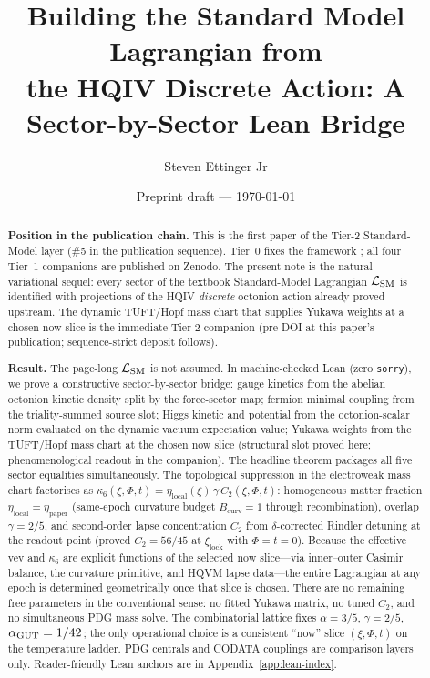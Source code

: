 \documentclass[11pt]{amsart}
\title[SM Lagrangian from HQIV Discrete Action]{Building the Standard Model Lagrangian from\\
the HQIV Discrete Action: A Sector-by-Sector Lean Bridge}
\author{Steven Ettinger Jr}
\date{Preprint draft --- \today}
\begin{document}
\begin{abstract}
\noindent\textbf{Position in the publication chain.}
This is the first paper of the Tier-2 Standard-Model layer (\#5 in the
publication sequence). Tier~0 fixes the framework
\cite{ettinger2026hqiv,hqiv-lightcone-paper,hqiv-so8-paper}; all four
Tier~1 companions
\cite{hqiv-3d-growth-paper,hqiv-oct-action-paper,hqiv-kirchhoff-paper,hqiv-thermo-arrow-paper}
are published on Zenodo. The present note is the natural variational sequel:
every sector of the textbook Standard-Model Lagrangian
$\mathcal{L}_{\rm SM}$ is identified with projections of the HQIV
\emph{discrete} octonion action already proved upstream. The dynamic
TUFT/Hopf mass chart that supplies Yukawa weights at a chosen now slice
is the immediate Tier-2 companion
\cite{hqiv-tuft-dynamic-mass-spectrum-paper} (pre-DOI at this paper's
publication; sequence-strict deposit follows).

\noindent\textbf{Result.}
The page-long $\mathcal{L}_{\rm SM}$ is not assumed. In
machine-checked Lean (zero \texttt{sorry}), we prove a
constructive sector-by-sector bridge: gauge kinetics from the
abelian octonion kinetic density split by the force-sector map;
fermion minimal coupling from the triality-summed source slot;
Higgs kinetic and potential from the octonion-scalar norm evaluated
on the dynamic vacuum expectation value; Yukawa weights from the
TUFT/Hopf mass chart at the chosen now slice (structural slot proved
here; phenomenological readout in the companion). The headline theorem
packages all five sector equalities simultaneously. The topological
suppression in the electroweak mass chart factorises as
$\kappa_6(\xi,\Phi,t)=\eta_{\mathrm{local}}(\xi)\,\gamma\,C_2(\xi,\Phi,t)$:
homogeneous matter fraction $\eta_{\mathrm{local}}=\eta_{\mathrm{paper}}$
(same-epoch curvature budget $B_{\mathrm{curv}}=1$ through recombination),
overlap $\gamma=2/5$, and second-order lapse
concentration $C_2$ from $\delta$-corrected Rindler detuning at the
readout point (proved $C_2=56/45$ at $\xi_{\mathrm{lock}}$ with
$\Phi=t=0$). Because the effective vev and $\kappa_6$ are explicit
functions of the selected now slice---via inner--outer Casimir balance,
the curvature primitive, and HQVM lapse data---the entire Lagrangian at
any epoch is determined geometrically once that slice is chosen. There
are no remaining free parameters in the conventional sense: no fitted
Yukawa matrix, no tuned $C_2$, and no simultaneous PDG mass solve. The
combinatorial lattice fixes $\alpha=3/5$, $\gamma=2/5$,
$\alpha_{\rm GUT}=1/42$; the only operational choice is a consistent
``now'' slice $(\xi,\Phi,t)$ on the temperature ladder. PDG centrals
and CODATA couplings are comparison layers only. Reader-friendly Lean
anchors are in Appendix~\ref{app:lean-index}.


\end{abstract}
\end{document}
